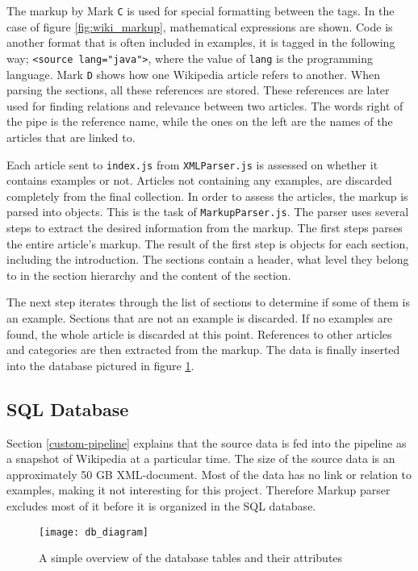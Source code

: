 The markup by Mark \texttt{C} is used for special formatting between the tags. In the case of figure \ref{fig:wiki_markup}, mathematical expressions are shown. Code is another format that is often included in examples, it is tagged in the following way; \texttt{<source lang="java">}, where the value of \texttt{lang} is the programming language. Mark \texttt{D} shows how one Wikipedia article refers to another. When parsing the sections, all these references are stored. These references are later used for finding relations and relevance between two articles. The words right of the pipe is the reference name, while the ones on the left are the names of the articles that are linked to. 


Each article sent to \texttt{index.js} from \texttt{XMLParser.js} is assessed on whether it contains examples or not. Articles not containing any examples, are discarded completely from the final collection. In order to assess the articles, the markup is parsed into objects. This is the task of \texttt{MarkupParser.js}. The parser uses several steps to extract the desired information from the markup. The first steps parses the entire article's markup. The result of the first step is objects for each section, including the introduction. The sections contain a header, what level they belong to in the section hierarchy and the content of the section. 

The next step iterates through the list of sections to determine if some of them is an example. Sections that are not an example is discarded. If no examples are found, the whole article is discarded at this point. References to other articles and categories are then extracted from the markup. The data is finally inserted into the database pictured in figure \ref{fig:db_diagram}.



\subsection{SQL Database}

Section \ref{custom-pipeline} explains that the source data is fed into the pipeline as a snapshot of Wikipedia at a particular time. The size of the source data is an approximately 50 GB XML-document. Most of the data has no link or relation to examples, making it not interesting for this project. Therefore Markup parser excludes most of it before it is organized in the SQL database. 

\begin{figure}[h] 
\caption{A simple overview of the database tables and their attributes}
\texttt{[image: db\_diagram]}
\label{fig:db_diagram}
\end{figure}

